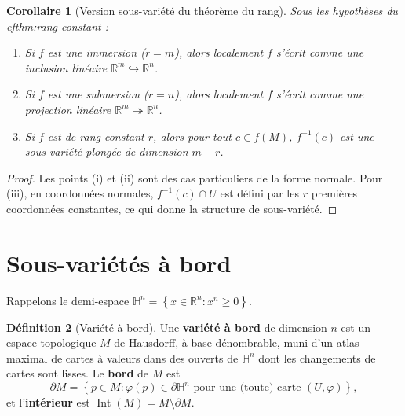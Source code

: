 \documentclass[12pt,a4paper,openany]{book}
\theoremstyle{definition}
\newtheorem{definition}{Définition}[chapter]
\theoremstyle{plain}
\newtheorem{corollaire}[definition]{Corollaire}
\theoremstyle{remark}
\newcommand{\R}{\mathbb{R}}
\newcommand{\set}[1]{\left\{#1\right\}}
\begin{document}
\begin{corollaire}[Version sous-variété du théorème du rang]\label{cor:rang-sous-variete}
Sous les hypothèses du 
ef{thm:rang-constant} :
\begin{enumerate}[label=(\roman*)]
  \item Si $f$ est une immersion ($r = m$), alors localement $f$ s'écrit comme
    une inclusion linéaire $\R^m \hookrightarrow \R^n$.
  \item Si $f$ est une submersion ($r = n$), alors localement $f$ s'écrit comme
    une projection linéaire $\R^m \twoheadrightarrow \R^n$.
  \item Si $f$ est de rang constant $r$, alors pour tout $c \in f(M)$, $f^{-1}(c)$
    est une sous-variété plongée de dimension $m - r$.
\end{enumerate}
\end{corollaire}

\begin{proof}
Les points (i) et (ii) sont des cas particuliers de la forme normale. Pour (iii),
en coordonnées normales, $f^{-1}(c) \cap U$ est défini par les $r$ premières
coordonnées constantes, ce qui donne la structure de sous-variété.
\end{proof}

\section{Sous-variétés à bord}\label{sec:sous-varietes-bord}

Rappelons le demi-espace $\mathbb{H}^n = \set{x \in \R^n : x^n \geqslant 0}$.

\begin{definition}[Variété à bord]\label{def:variete-bord}
Une \textbf{variété à bord} de dimension $n$ est un espace topologique $M$ de
Hausdorff, à base dénombrable, muni d'un atlas maximal de cartes à valeurs dans
des ouverts de $\mathbb{H}^n$ dont les changements de cartes sont lisses.
Le \textbf{bord} de $M$ est
\[
  \partial M = \set{p \in M : \varphi(p) \in \partial \mathbb{H}^n \text{ pour une (toute) carte } (U, \varphi)},
\]
et l'\textbf{intérieur} est $\operatorname{Int}(M) = M \setminus \partial M$.
\end{definition}
\end{document}

